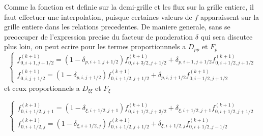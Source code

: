 Comme la fonction est definie sur la demi-grille et les flux sur la
grille entiere, il faut effectuer une interpolation, puisque certaines
valeurs de $f$ apparaissent sur la grille entiere dans les relations
precedentes. De maniere generale, sans se preoccuper de l'expression
precise du facteur de ponderation $\delta$ qui sera discutee plus
loin, on peut ecrire pour les termes proportionnnels a $D_{pp}$ et
$F_{p}$\[
\left\{ \begin{array}{l}
f_{0,i+1,j+1/2}^{(k+1)}=\left(1-\delta_{p,i+1,j+1/2}\right)f_{0,i+3/2,j+1/2}^{(k+1)}+\delta_{p,i+1,j+1/2}f_{0,i+1/2,j+1/2}^{(k+1)}\\
f_{0,i,j+1/2}^{(k+1)}=\left(1-\delta_{p,i,j+1/2}\right)f_{0,i+1/2,j+1/2}^{(k+1)}+\delta_{p,i,j+1/2}f_{0,i-1/2,j+1/2}^{(k+1)}\end{array}\right.\]
 et ceux proportionnels a $D_{\xi\xi}$ et $F_{\xi}$

\[
\left\{ \begin{array}{l}
f_{0,i+1/2,j+1}^{(k+1)}=\left(1-\delta_{\xi,i+1/2,j+1}\right)f_{0,i+1/2,j+3/2}^{(k+1)}+\delta_{\xi,i+1/2,j+1}f_{0,i+1/2,j+1/2}^{(k+1)}\\
f_{0,i+1/2,j}^{(k+1)}=\left(1-\delta_{\xi,i+1/2,j}\right)f_{0,i+1/2,j+1/2}^{(k+1)}+\delta_{\xi,i+1/2,j}f_{0,i+1/2,j-1/2}^{(k+1)}\end{array}\right.\]


